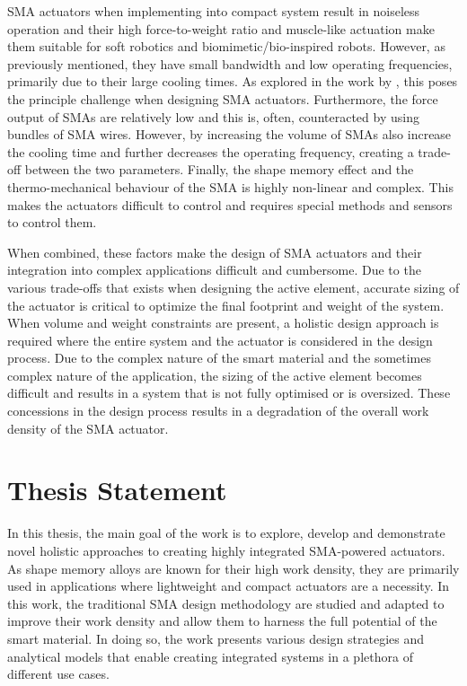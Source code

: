 SMA actuators when implementing into compact system result in noiseless operation and their high force-to-weight ratio and muscle-like actuation make them suitable for soft robotics and biomimetic/bio-inspired robots. However, as previously mentioned, they have small bandwidth and low operating frequencies, primarily due to their large cooling times. As explored in the work by \cite{sootherChallengesPracticalApplications2020}, this poses the principle challenge when designing SMA actuators. Furthermore, the force output of SMAs are relatively low and this is, often, counteracted by using bundles of SMA wires. However, by increasing the volume of SMAs also increase the cooling time and further decreases the operating frequency, creating a trade-off between the two parameters. Finally, the shape memory effect and the thermo-mechanical behaviour of the SMA is highly non-linear and complex. This makes the actuators difficult to control and requires special methods and sensors to control them.

When combined, these factors make the design of SMA actuators and their integration into complex applications difficult and cumbersome. Due to the various trade-offs that exists when designing the active element, accurate sizing of the actuator is critical to optimize the final footprint and weight of the system. When volume and weight constraints are present, a holistic design approach is required where the entire system and the actuator is considered in the design process. Due to the complex nature of the smart material and the sometimes complex nature of the application, the sizing of the active element becomes difficult and results in a system that is not fully optimised or is oversized. These concessions in the design process results in a degradation of the overall work density of the SMA actuator.

\section*{Thesis Statement}
In this thesis, the main goal of the work is to explore, develop and demonstrate novel holistic approaches to creating highly integrated SMA-powered actuators. As shape memory alloys are known for their high work density, they are primarily used in applications where lightweight and compact actuators are a necessity. In this work, the traditional SMA design methodology are studied and adapted to improve their work density and allow them to harness the full potential of the smart material. In doing so, the work presents various design strategies and analytical models that enable creating integrated systems in a plethora of different use cases.

